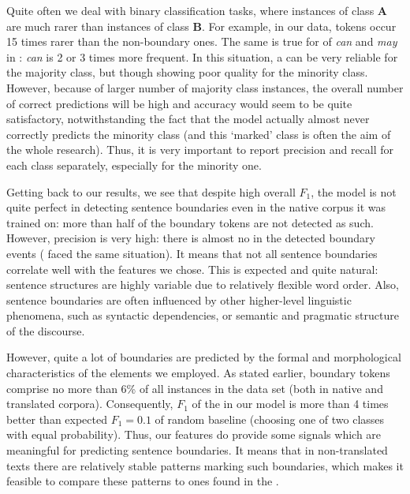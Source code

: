 \documentclass[output=paper]{langsci/langscibook.cls}
\begin{document}
Quite often we deal with binary classification tasks, where instances of class \textbf{A} are much rarer than instances of class \textbf{B}. For example, in our data,  tokens occur 15 times rarer than the non-boundary ones. The same is true for  of \textit{can} and \textit{may} in \citet{Gries:2014}: \textit{can} is 2 or 3 times more frequent. In this situation, a  can be very reliable for the majority class, but though showing poor quality for the minority class. However, because of larger number of majority class instances, the overall number of correct predictions will be high and accuracy would seem to be quite satisfactory, notwithstanding the fact that the model actually almost never correctly predicts the minority class (and this `marked' class is often the aim of the whole research). Thus, it is very important to report precision and recall for each class separately, especially for the minority one.

Getting back to our results, we see that despite high overall $F_{1}$, the model is not quite perfect in detecting sentence boundaries even in the native corpus it was trained on: more than half of the boundary tokens are not detected as such. However, precision is very high: there is almost no  in the detected boundary events (\citet{baroni2005new} faced the same situation). It means that not all sentence boundaries correlate well with the features we chose. This is expected and quite natural:  sentence structures are highly variable due to relatively flexible word order. Also, sentence boundaries are often influenced by other higher-level linguistic phenomena, such as syntactic dependencies, or semantic and pragmatic structure of the discourse.

However, quite a lot of boundaries are predicted by the formal and morphological characteristics of the elements we employed. As stated earlier, boundary tokens comprise no more than 6\% of all instances in the data set (both in native and translated corpora). Consequently, $F_{1}$ of the   in our model is more than 4 times better than expected $F_{1} = 0.1$ of random baseline (choosing one of two classes with equal probability). Thus, our features do provide some signals which are meaningful for predicting sentence boundaries. It means that in non-translated  texts there are relatively stable patterns marking such boundaries, which makes it feasible to compare these patterns to ones found in the .
\end{document}
